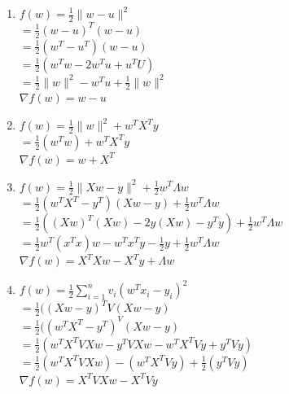 \documentclass{article}
\def\norm#1{\|#1\|}
\begin{document}
\begin{enumerate}
     \item  $f(w) = \frac{1}{2}\norm{w-u}^2$\\
                      	$ = \frac{1}{2}(w-u)^T (w-u)$\\
                     	$ = \frac{1}{2}(w^T-u^T) (w-u)$\\
				$ = \frac{1}{2}(w^T w - 2w^T u + u^T U)$\\
                      	$= \frac{1}{2}\norm{w}^2 - w^T u +  \frac{1}{2}\norm{w}^2$\\
 				 $\nabla f(w) = w-u$ \\
               
    \item   $f(w) = \frac{1}{2}\norm{w}^2 + w^TX^Ty$\\
                   $ = \frac{1}{2}(w^T w) + w^TX^Ty$\\
			  $ \nabla f(w) =  w+ X^T$\\
   
      \item   $f(w)= \frac{1}{2}\norm{Xw - y}^2 + \frac{1}{2}w^T\Lambda w$\\
                 $= \frac{1}{2}(w^TX^T-y^T)(Xw-y) + \frac{1}{2}w^T\Lambda w$\\
			    $= \frac{1}{2}((Xw)^T(Xw)-2y(Xw)-y^Ty) + \frac{1}{2}w^T\Lambda w$\\
 			$= \frac{1}{2}w^T(x^Tx)w - w^Tx^Ty-  \frac{1}{2}y+ \frac{1}{2}w^T\Lambda w$\\
                 $ \nabla f(w) = X^TXw- X^Ty+\Lambda w$\\


        \item  $f(w) = \frac{1}{2}\sum_{i=1}^n v_i (w^Tx_i - y_i)^2$\\
                 $ = \frac{1}{2}( (Xw-y)^TV(Xw-y)$\\
                    $ = \frac{1}{2}( (w^TX^T-y^T)^V(Xw-y)$\\
                    $ = \frac{1}{2}(w^TX^TVXw - y^TVXw- w^TX^TVy+y^TVy)$\\
                     $ = \frac{1}{2}(w^TX^TVXw) -  (w^TX^TVy)+ \frac{1}{2}(y^TVy)$\\
  			$ \nabla f(w) = X^TVXw- X^TVy$\\

 
\end{enumerate}



\end{document}
